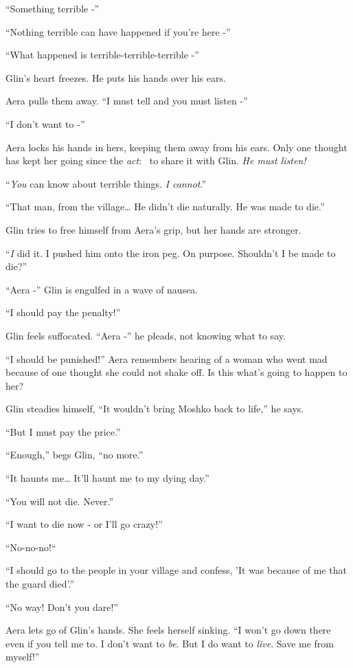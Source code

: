 \documentclass[twoside,11pt]{book}
\begin{document}
``Something terrible -''

``Nothing terrible can have happened if you're here -''

``What happened is terrible-terrible-terrible -''

Glin's heart freezes. He puts his hands over his ears.

Aera pulls them away. ``I must tell and you must listen -''

``I don't want to -''

Aera locks his hands in hers, keeping them away from his ears. Only one thought has kept her going since the
\textit{act}: \ to share it with Glin. \textit{He must listen! }

``\textit{You} can know about terrible things. \textit{I cannot}.''

``That man, from the village{\dots} He didn't die naturally. He was made to die.''

Glin tries to free himself from Aera's grip, but her hands are stronger.

``\textit{I} did it. I pushed him onto the iron peg. On purpose. Shouldn't I be made to die?''


``Aera -'' Glin is engulfed in a wave of nausea.

``I should pay the penalty!''

Glin feels suffocated. ``Aera -'' he pleads, not knowing what to say.

``I should be punished!'' Aera remembers hearing of a woman who went mad because of one
thought she could not shake off. Is this what's going to happen to her?

Glin steadies himself, ``It wouldn't bring Moshko back to life,'' he says.

``But I must pay the price.''

``Enough,'' begs Glin, ``no more.''

``It haunts me{\dots} It'll haunt me to my dying day.''

``You will not die. Never.''

``I want to die now - or I'll go crazy!''

``No-no-no!``~

``I should go to the people in your village and confess, 'It was because of me that the guard
died'.''

``No way! Don't you dare!'' ~~~~~~~~~~~~~~~~~~~~~~~~~~~~~~~~~~~~~~~~~~~~

Aera lets go of Glin's hands. She feels herself sinking. ``I won't go down there even if you tell me to. I
don't want to \textit{be}. But I do want to \textit{live}. Save me from myself!''
\end{document}
